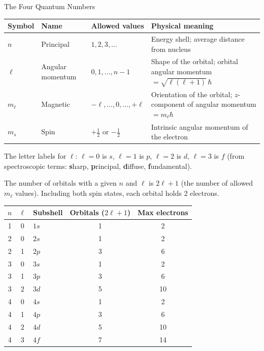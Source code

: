 \documentclass[12pt, a4paper]{book}
\begin{document}
\begin{namedconcept}{The Four Quantum Numbers}
\begin{center}
\begin{tabular}{lllp{6cm}}
\toprule
Symbol & Name & Allowed values & Physical meaning \\
\midrule
$n$ & Principal & $1, 2, 3, \ldots$ & Energy shell; average distance from nucleus \\[4pt]
$\ell$ & Angular momentum & $0, 1, \ldots, n-1$ & Shape of the orbital; orbital angular momentum $= \sqrt{\ell(\ell+1)}\,\hbar$ \\[4pt]
$m_\ell$ & Magnetic & $-\ell, \ldots, 0, \ldots, +\ell$ & Orientation of the orbital; $z$-component of angular momentum $= m_\ell\hbar$ \\[4pt]
$m_s$ & Spin & $+\tfrac{1}{2}$ or $-\tfrac{1}{2}$ & Intrinsic angular momentum of the electron \\
\bottomrule
\end{tabular}
\end{center}

The letter labels for $\ell$: $\ell=0$ is $s$, $\ell=1$ is $p$,
$\ell=2$ is $d$, $\ell=3$ is $f$
(from spectroscopic terms: \textbf{s}harp, \textbf{p}rincipal,
\textbf{d}iffuse, \textbf{f}undamental).
\end{namedconcept}

\vspace{0.5em}

The number of orbitals with a given $n$ and $\ell$
is $2\ell+1$ (the number of allowed $m_\ell$ values).
Including both spin states, each orbital holds 2 electrons.

\begin{center}
\begin{tabular}{cclcc}
\toprule
$n$ & $\ell$ & Subshell & Orbitals ($2\ell+1$) & Max electrons \\
\midrule
1 & 0 & $1s$ & 1 & 2 \\
2 & 0 & $2s$ & 1 & 2 \\
2 & 1 & $2p$ & 3 & 6 \\
3 & 0 & $3s$ & 1 & 2 \\
3 & 1 & $3p$ & 3 & 6 \\
3 & 2 & $3d$ & 5 & 10 \\
4 & 0 & $4s$ & 1 & 2 \\
4 & 1 & $4p$ & 3 & 6 \\
4 & 2 & $4d$ & 5 & 10 \\
4 & 3 & $4f$ & 7 & 14 \\
\bottomrule
\end{tabular}
\end{center}
\end{document}
